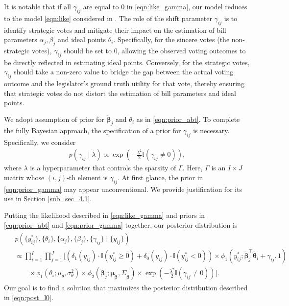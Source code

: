 \documentclass[11pt]{article}
\begin{document}
It is notable that if all $ \gamma_{ij} $ are equal to 0 in \eqref{eqn:like_gamma}, our model reduces to the model \eqref{eqn:like} considered in \cite{Clinton2004}.
The role of the shift parameter $ \gamma_{ij} $ is to identify strategic votes and mitigate their impact on the estimation of bill parameters $ \alpha_j, \beta_j $ and ideal points $ \theta_i $. Specifically, for the sincere votes (the non-strategic votes), $\gamma_{ij} $ should be set to 0, allowing the observed voting outcomes to be directly reflected in estimating ideal points. Conversely, for the strategic votes, $ \gamma_{ij} $ should take a non-zero value to bridge the gap between the actual voting outcome and the legislator's ground truth utility for that vote, thereby ensuring that strategic votes do not distort the estimation of bill parameters and ideal points.

We adopt assumption of prior for $\boldsymbol{\tilde{\beta}}_j$ and $\theta_i$ as in \eqref{eqn:prior_abt}. To complete the fully Bayesian approach, the specification of a prior for $ \gamma_{ij} $ is necessary. Specifically, we consider 
\begin{align}\label{eqn:prior_gamma}
    p(\gamma_{ij} \mid \lambda) \propto \exp\left( -\frac{\lambda^2}{2} \mathbb{I}(\gamma_{ij} \neq 0)\right),
\end{align} 
where $ \lambda $ is a hyperparameter that controls the sparsity of $ \Gamma $. Here, $ \Gamma $ is an $ I \times J $ matrix whose $(i,j)$-th element is $ \gamma_{ij} $. At first glance, the prior in \eqref{eqn:prior_gamma} may appear unconventional. We provide justification for its use in Section \ref{sub_sec_4.1}.

Putting the likelihood described in \eqref{eqn:like_gamma} and priors in \eqref{eqn:prior_abt} and \eqref{eqn:prior_gamma} together, our posterior distribution is
\begin{align}\label{eqn:post_l0}
    \begin{split}
        &p\left(\{y_{ij}^*\}, \{\theta_i\}, \{\alpha_j\}, \{\beta_j\}, \{\gamma_{ij}\} \mid \{y_{ij}\}\right) \\
        &\propto \prod_{i=1}^I \prod_{j = 1}^J 
        \bigg[\left(\delta_1(y_{ij})  \cdot \mathbb{I}(y_{ij}^* \geq 0) + \delta_0(y_{ij}) \cdot \mathbb{I}(y_{ij}^* < 0) \right) \times \phi_1\left(y_{ij}^*; \boldsymbol{\tilde{\beta}}_j^\top \boldsymbol{\tilde{\theta}}_i + \gamma_{ij}, 1\right)\\
        &\quad \quad \times \phi_1\left(\theta_i; \mu_{\theta}, \sigma_{\theta}^2 \right) \times \phi_{2}\left(\boldsymbol{\tilde{\beta}}_j ; \boldsymbol{\mu}_{\boldsymbol{\tilde{\beta}}}, \Sigma_{\boldsymbol{\tilde{\beta}}}\right) \times \exp\left( -\frac{\lambda^2}{2} \mathbb{I}(\gamma_{ij} \neq 0)\right)\bigg].
    \end{split}
\end{align}
Our goal is to find a solution that maximizes the posterior distribution described in \eqref{eqn:post_l0}.
\end{document}
